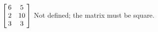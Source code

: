 {$\left[\hskip -3pt \begin{array}{cc} 6&5\\  2&10
\\  3&3\end{array}\hskip -3pt \right]$} 
{Not defined; the matrix must be square.}



  

